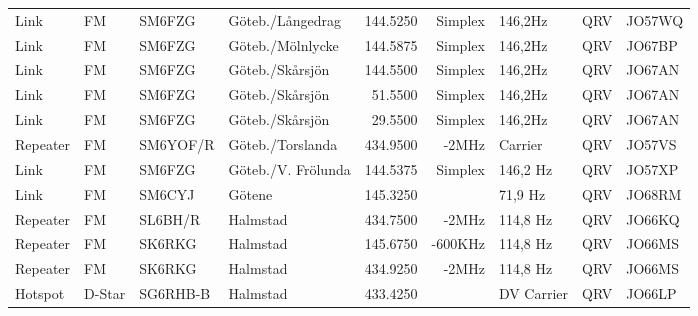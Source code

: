 \begin{landscape}
\begin{longtable}{llllrrlcl}
	Link                      & FM            & SM6FZG        & Göteb./Långedrag    & 144.5250          & Simplex        & 146,2Hz          & QRV             & JO57WQ           \\
	Link                      & FM            & SM6FZG        & Göteb./Mölnlycke    & 144.5875          & Simplex        & 146,2Hz          & QRV             & JO67BP           \\
	Link                      & FM            & SM6FZG        & Göteb./Skårsjön     & 144.5500          & Simplex        & 146,2Hz          & QRV             & JO67AN           \\
	Link                      & FM            & SM6FZG        & Göteb./Skårsjön     & 51.5500           & Simplex        & 146,2Hz          & QRV             & JO67AN           \\
	Link                      & FM            & SM6FZG        & Göteb./Skårsjön     & 29.5500           & Simplex        & 146,2Hz          & QRV             & JO67AN           \\
	Repeater                  & FM            & SM6YOF/R      & Göteb./Torslanda    & 434.9500          & -2MHz          & Carrier          & QRV             & JO57VS           \\
	Link                      & FM            & SM6FZG        & Göteb./V. Frölunda  & 144.5375          & Simplex        & 146,2 Hz         & QRV             & JO57XP           \\
	Link                      & FM            & SM6CYJ        & Götene              & 145.3250          &                & 71,9 Hz          & QRV             & JO68RM           \\
	Repeater                  & FM            & SL6BH/R       & Halmstad            & 434.7500          & -2MHz          & 114,8 Hz         & QRV             & JO66KQ           \\
	Repeater                  & FM            & SK6RKG        & Halmstad            & 145.6750          & -600KHz        & 114,8 Hz         & QRV             & JO66MS           \\
	Repeater                  & FM            & SK6RKG        & Halmstad            & 434.9250          & -2MHz          & 114,8 Hz         & QRV             & JO66MS           \\
	Hotspot                   & D-Star        & SG6RHB-B      & Halmstad            & 433.4250          &                & DV Carrier       & QRV             & JO66LP           \\

\end{longtable}
\end{landscape}
